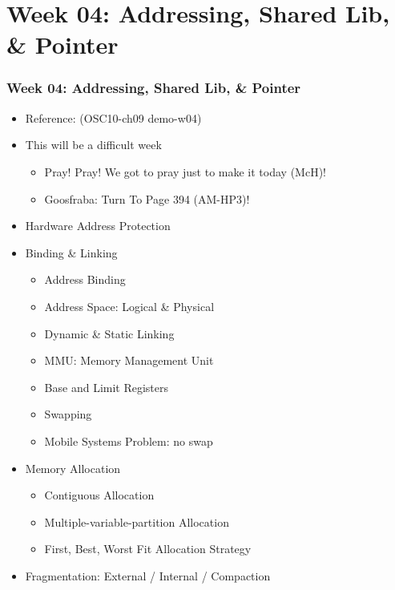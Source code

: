 \documentclass[xcolor=table, notheorems, hyperref={pdfpagelabels=false}]{beamer}
\begin{document}
\section{Week 04: Addressing, Shared Lib, \& Pointer}
\begin{frame}
\frametitle{Week 04: Addressing, Shared Lib, \& Pointer}
\begin{itemize}
\item Reference: (OSC10-ch09 demo-w04)
\item This will be a difficult week
\begin{itemize}
\item Pray! Pray! We got to pray just to make it today (McH)!
\item Goosfraba: Turn To Page 394 (AM-HP3)!
\end{itemize}
\item Hardware Address Protection
\item Binding \& Linking
\begin{itemize}
\item Address Binding
\item Address Space: Logical \& Physical
\item Dynamic \& Static Linking
\item MMU: Memory Management Unit
\item Base and Limit Registers
\item Swapping
\item Mobile Systems Problem: no swap
\end{itemize}
\item Memory Allocation
\begin{itemize}
\item Contiguous Allocation
\item Multiple-variable-partition Allocation
\item First, Best, Worst Fit Allocation Strategy
\end{itemize}
\item Fragmentation: External / Internal / Compaction
\end{itemize}
\end{frame}

\end{document}
